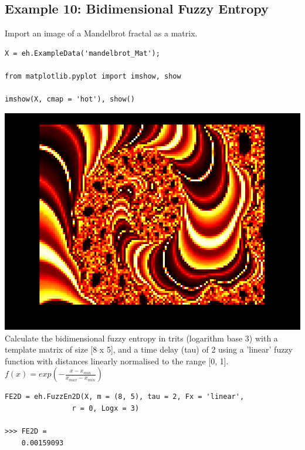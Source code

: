\documentclass[12pt, a4paper, titlepage, openany]{book}
\begin{document}
\subsection{\normalsize Example 10: \hspace{15mm} Bidimensional Fuzzy Entropy}
\noindent Import an image of a Mandelbrot fractal as a matrix.
\begin{verbatim}
X = eh.ExampleData('mandelbrot_Mat');

from matplotlib.pyplot import imshow, show

imshow(X, cmap = 'hot'), show()
\end{verbatim}
\includegraphics[scale=.4]{mandelbrot.png}\newline \newline
Calculate the bidimensional fuzzy entropy in trits (logarithm base 3) with a template matrix of size [8 x 5], and a time delay (tau) of 2  using a 'linear' fuzzy function with distances linearly normalised to the range [0, 1].\newline 	$f(x) = exp(-\frac{x - x_{min}}{x_{max} - x_{min}}) $
\begin{verbatim}
FE2D = eh.FuzzEn2D(X, m = (8, 5), tau = 2, Fx = 'linear',
				r = 0, Logx = 3)

>>> FE2D = 
	0.00159093
\end{verbatim}
\end{document}
